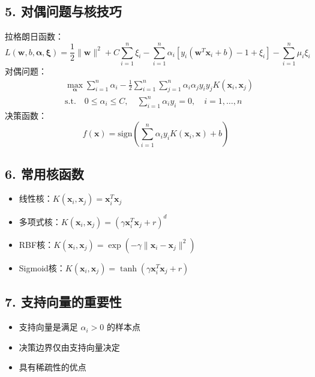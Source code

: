 \documentclass{article}
\begin{document}
	\subsection*{5. 对偶问题与核技巧}
	拉格朗日函数：
	\[
	L(\mathbf{w}, b, \boldsymbol{\alpha}, \boldsymbol{\xi}) = \frac{1}{2} \|\mathbf{w}\|^2 + C \sum_{i=1}^n \xi_i - \sum_{i=1}^n \alpha_i [y_i (\mathbf{w}^T \mathbf{x}_i + b) - 1 + \xi_i] - \sum_{i=1}^n \mu_i \xi_i
	\]
	对偶问题：
	\[
	\begin{aligned}
		& \max_{\boldsymbol{\alpha}} \sum_{i=1}^n \alpha_i - \frac{1}{2} \sum_{i=1}^n \sum_{j=1}^n \alpha_i \alpha_j y_i y_j K(\mathbf{x}_i, \mathbf{x}_j) \\
		& \text{s.t.} \quad 0 \leq \alpha_i \leq C, \quad \sum_{i=1}^n \alpha_i y_i = 0, \quad i = 1, \dots, n
	\end{aligned}
	\]
	决策函数：
	\[
	f(\mathbf{x}) = \text{sign}\left( \sum_{i=1}^n \alpha_i y_i K(\mathbf{x}_i, \mathbf{x}) + b \right)
	\]
	
	\subsection*{6. 常用核函数}
	\begin{itemize}
		\item 线性核：\( K(\mathbf{x}_i, \mathbf{x}_j) = \mathbf{x}_i^T \mathbf{x}_j \)
		\item 多项式核：\( K(\mathbf{x}_i, \mathbf{x}_j) = (\gamma \mathbf{x}_i^T \mathbf{x}_j + r)^d \)
		\item RBF核：\( K(\mathbf{x}_i, \mathbf{x}_j) = \exp(-\gamma \|\mathbf{x}_i - \mathbf{x}_j\|^2) \)
		\item Sigmoid核：\( K(\mathbf{x}_i, \mathbf{x}_j) = \tanh(\gamma \mathbf{x}_i^T \mathbf{x}_j + r) \)
	\end{itemize}
	
	\subsection*{7. 支持向量的重要性}
	\begin{itemize}
		\item 支持向量是满足 \( \alpha_i > 0 \) 的样本点
		\item 决策边界仅由支持向量决定
		\item 具有稀疏性的优点
	\end{itemize}
	
\end{document}
